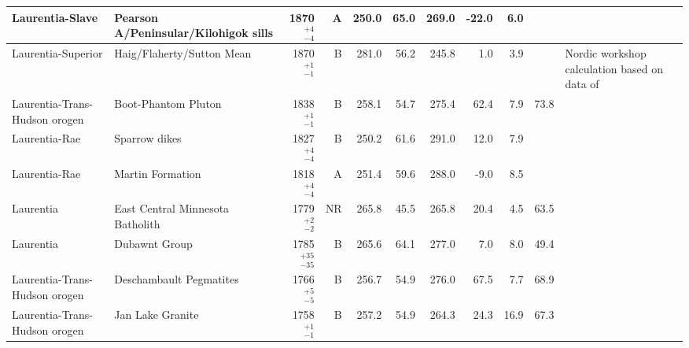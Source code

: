 \documentclass[twocolumn, switch]{article} %
\begin{document}
{\begin{landscape}
\begin{ThreePartTable}
\begin{longtable}{p{1.4 in}p{1.2 in}rrrrrrrrp{1.2 in}}
               Laurentia-Slave &               Pearson A/Peninsular/Kilohigok sills &     1870$^{+4}_{-4}$ &      A &     250.0 &      65.0 & 269.0 & -22.0 &       6.0 &          &                               \cite{Mitchell2010c} \\ \hline
            Laurentia-Superior &                         Haig/Flaherty/Sutton Mean  &     1870$^{+1}_{-1}$ &      B &     281.0 &      56.2 & 245.8 &   1.0 &       3.9 &          &  Nordic workshop calculation based on data of \cite{Schmidt1980a, Schwarz1982a} \\ \hline
 Laurentia-Trans-Hudson orogen &                                Boot-Phantom Pluton &     1838$^{+1}_{-1}$ &      B &     258.1 &      54.7 & 275.4 &  62.4 &       7.9 &        73.8 &                                 \cite{Symons1999a} \\ \hline
                 Laurentia-Rae &                                      Sparrow dikes &     1827$^{+4}_{-4}$ &      B &     250.2 &      61.6 & 291.0 &  12.0 &       7.9 &          &                                \cite{McGlynn1974a} \\ \hline
                 Laurentia-Rae &                                   Martin Formation &     1818$^{+4}_{-4}$ &      A &     251.4 &      59.6 & 288.0 &  -9.0 &       8.5 &          &                                  \cite{Evans1973a} \\ \hline
                 Laurentia &                                   East Central Minnesota Batholith &     1779$^{+2}_{-2}$ &      NR &     265.8 &      45.5 & 265.8 &  20.4 &      4.5 &        63.5 &                                   \cite{Swanson-Hysell2021b} \\ \hline
                     Laurentia &                                      Dubawnt Group &   1785$^{+35}_{-35}$ &      B &     265.6 &      64.1 & 277.0 &   7.0 &       8.0 &        49.4 &                                   \cite{Park1973a} \\ \hline
 Laurentia-Trans-Hudson orogen &                            Deschambault Pegmatites &     1766$^{+5}_{-5}$ &      B &     256.7 &      54.9 & 276.0 &  67.5 &       7.7 &        68.9 &                                 \cite{Symons2000a} \\ \hline
 Laurentia-Trans-Hudson orogen &                                   Jan Lake Granite &     1758$^{+1}_{-1}$ &      B &     257.2 &      54.9 & 264.3 &  24.3 &      16.9 &        67.3 &                                   \cite{Gala1995a} \\ \hline

\end{longtable}
\end{ThreePartTable}
\end{landscape}}
\end{document}
